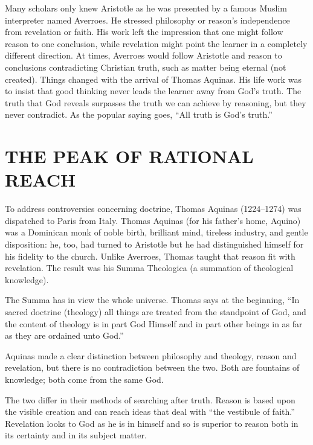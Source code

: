 Many scholars only knew Aristotle as he was presented by a famous Muslim interpreter named Averroes.
He stressed philosophy or reason’s independence from revelation or faith. His work left the
impression that one might follow reason to one conclusion, while revelation might point the learner
in a completely different direction. At times, Averroes would follow Aristotle and reason to
conclusions contradicting Christian truth, such as matter being eternal (not created). Things
changed with the arrival of Thomas Aquinas. His life work was to insist that good thinking never
leads the learner away from God’s truth. The truth that God reveals surpasses the truth we can
achieve by reasoning, but they never contradict. As the popular saying goes, “All truth is God’s
truth.”

\section{THE PEAK OF RATIONAL REACH}

To address controversies concerning doctrine, Thomas Aquinas (1224–1274) was dispatched to Paris
from Italy. Thomas Aquinas (for his father’s home, Aquino) was a Dominican monk of noble birth,
brilliant mind, tireless industry, and gentle disposition: he, too, had turned to Aristotle but he
had distinguished himself for his fidelity to the church. Unlike Averroes, Thomas taught that reason
fit with revelation. The result was his Summa Theologica (a summation of theological knowledge).

The Summa has in view the whole universe. Thomas says at the beginning, “In sacred doctrine
(theology) all things are treated from the standpoint of God, and the content of theology is in part
God Himself and in part other beings in as far as they are ordained unto God.”

Aquinas made a clear distinction between philosophy and theology, reason and revelation, but there
is no contradiction between the two. Both are fountains of knowledge; both come from the same God.


The two differ in their methods of searching after truth. Reason is based upon the visible creation
and can reach ideas that deal with “the vestibule of faith.” Revelation looks to God as he is in
himself and so is superior to reason both in its certainty and in its subject matter.

